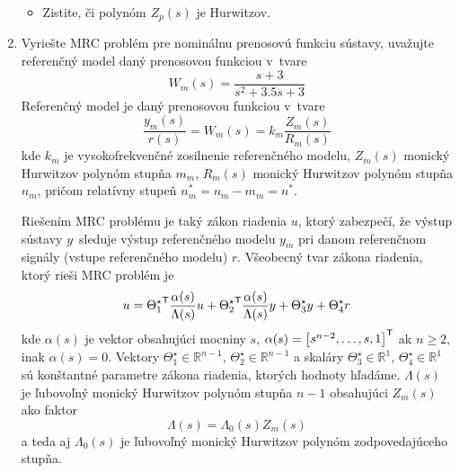 \documentclass[a4paper, 10pt, ]{article}
\begin{document}
\begin{enumerate}[leftmargin=0pt, labelsep=4mm, itemsep=0pt]
\begin{itemize}[leftmargin=0pt, labelsep=4mm, itemsep=0pt]
        \item Zistite, či polynóm $Z_p(s)$ je Hurwitzov.
    \end{itemize}



    \item Vyriešte MRC problém pre nominálnu prenosovú funkciu sústavy, uvažujte referenčný model daný prenosovou funkciou v~tvare
    \begin{equation}
    	W_m(s) = \frac{s + 3}{ s^2 + 3.5 s + 3}
    \end{equation}
    Referenčný model je daný prenosovou funkciou v~tvare
    \begin{equation} \label{C_RefModelMRCp}
    	\frac{y_m(s)}{r(s)} = W_m(s) = k_m \frac{Z_m(s)}{R_m(s)}
    \end{equation}
    kde $k_m$ je vysokofrekvenčné zosilnenie referenčného modelu, $Z_m(s)$ monický Hurwitzov polynóm stupňa $m_m$, $R_m(s)$ monický Hurwitzov polynóm stupňa $n_m$, pričom relatívny stupeň $n^*_m = n_m - m_m = n^*$.

    Riešením MRC problému je taký zákon riadenia $u$, ktorý zabezpečí, že výstup sústavy $y$~sleduje výstup referenčného modelu $y_m$ pri danom referenčnom signály (vstupe referenčného modelu) $r$. Všeobecný tvar zákona riadenia, ktorý rieši MRC problém je
    \begin{equation} \label{C_generalControlLaw}
    	u = {\Theta_1^\star}^{\mathsf{T}} \frac{\alpha(s)}{\Lambda(s)} u + {\Theta_2^\star}^{\mathsf{T}} \frac{\alpha(s)}{\Lambda(s)} y + \Theta_3^\star y + \Theta_4^\star r
    \end{equation}
    kde $\alpha(s)$ je vektor obsahujúci mocniny $s$, $\alpha(s) = \begin{bmatrix} s^{n-2}, \ldots,s, 1 \end{bmatrix}^{\mathsf{T}}$ ak $n\geq 2$, inak $\alpha(s) = 0$. Vektory $\Theta_1^\star \in \mathbb{R}^{n-1}$, $\Theta_2^\star \in \mathbb{R}^{n-1}$ a skaláry $\Theta_3^\star \in \mathbb{R}^1$, $\Theta_4^\star \in \mathbb{R}^1$ sú konštantné parametre zákona riadenia, ktorých hodnoty hľadáme.  $\Lambda(s)$ je ľubovoľný monický Hurwitzov polynóm stupňa $n-1$ obsahujúci $Z_m(s)$ ako faktor
    \begin{equation}
    	\Lambda(s) = \Lambda_0(s) Z_m(s)
    \end{equation}
    a teda aj $\Lambda_0(s)$ je ľubovoľný monický Hurwitzov polynóm zodpovedajúceho stupňa.



\end{enumerate}
\end{document}
